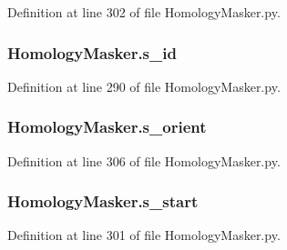 Definition at line 302 of file Homology\-Masker.\-py.

\hypertarget{namespaceHomologyMasker_ac2f25129910dffef91ae818d733d4dca}{
\subsubsection[{s\-\_\-id}]{\setlength{\rightskip}{0pt plus 5cm}Homology\-Masker.\-s\-\_\-id}}\label{namespaceHomologyMasker_ac2f25129910dffef91ae818d733d4dca}


Definition at line 290 of file Homology\-Masker.\-py.

\hypertarget{namespaceHomologyMasker_a2d92bc9565ce2b8a00c0d1027f2ef5b7}{
\subsubsection[{s\-\_\-orient}]{\setlength{\rightskip}{0pt plus 5cm}Homology\-Masker.\-s\-\_\-orient}}\label{namespaceHomologyMasker_a2d92bc9565ce2b8a00c0d1027f2ef5b7}


Definition at line 306 of file Homology\-Masker.\-py.

\hypertarget{namespaceHomologyMasker_a65cb71d469b8f9488ed03494375c874d}{
\subsubsection[{s\-\_\-start}]{\setlength{\rightskip}{0pt plus 5cm}Homology\-Masker.\-s\-\_\-start}}\label{namespaceHomologyMasker_a65cb71d469b8f9488ed03494375c874d}


Definition at line 301 of file Homology\-Masker.\-py.

